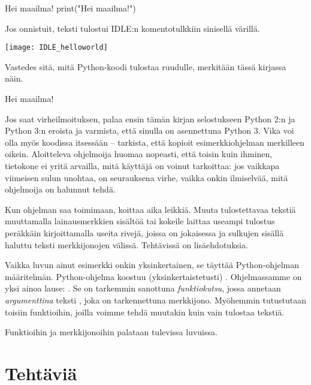 \begin{example}{Hei maailma!}
print("Hei maailma!")
\end{example}

Jos onnistuit, teksti  tulostui IDLE:n komentotulkkiin sinisellä värillä.

\texttt{[image: IDLE\_helloworld]}

Vastedes sitä, mitä Python-koodi tulostaa ruudulle, merkitään tässä kirjassa näin.

\begin{output}
Hei maailma!
\end{output}

Jos saat virheilmoituksen, palaa ensin tämän kirjan selostukseen Python 2:n ja Python 3:n eroista ja varmista, että sinulla on asennettuna Python 3. Vika voi olla myös koodissa itsessään -- tarkista, että kopioit esimerkkiohjelman merkilleen oikein. Aloitteleva ohjelmoija huomaa nopeasti, että toisin kuin ihminen, tietokone ei yritä arvailla, mitä käyttäjä on voinut tarkoittaa: jos vaikkapa viimeisen sulun unohtaa, on seurauksena virhe, vaikka onkin ilmiselvää, mitä ohjelmoija on halunnut tehdä.

Kun ohjelman saa toimimaan, koittaa aika leikkiä. Muuta tulostettavaa tekstiä muuttamalla lainausmerkkien sisältöä tai kokeile laittaa useampi tulostus peräkkäin kirjoittamalla useita rivejä, joissa on jokaisessa  ja sulkujen sisällä haluttu teksti merkkijonojen välissä. Tehtävissä on lisäehdotuksia.

Vaikka luvun ainut esimerkki onkin yksinkertainen, se täyttää Python-ohjelman määritelmän. Python-ohjelma koostuu (yksinkertaistetusti) . Ohjelmassamme on yksi ainoa lause: . Se on tarkemmin sanottuna \textit{funktiokutsu}, jossa   annetaan \textit{argumenttina} teksti , joka on tarkennettuna \gls{merkkijono}. Myöhemmin tutustutaan toisiin funktioihin, joilla voimme tehdä muutakin kuin vain tulostaa tekstiä.

Funktioihin ja merkkijonoihin palataan tulevissa luvuissa.

\section{Tehtäviä}

